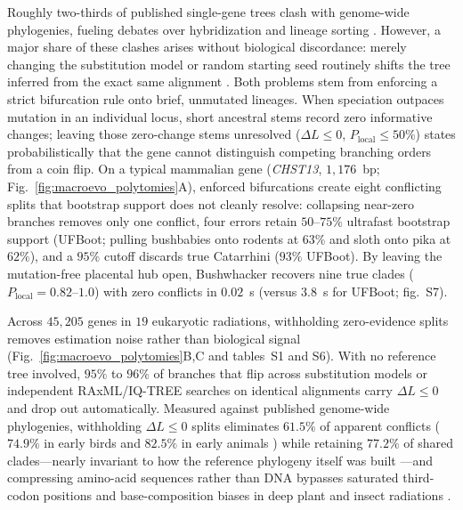 \documentclass[12pt]{article}
\begin{document}
Roughly two-thirds of published single-gene trees clash with genome-wide phylogenies, fueling debates over hybridization and lineage sorting \cite{rokas2006animal,shen2017contentious}. However, a major share of these clashes arises without biological discordance: merely changing the substitution model or random starting seed routinely shifts the tree inferred from the exact same alignment \cite{abadi2019model}. Both problems stem from enforcing a strict bifurcation rule onto brief, unmutated lineages. When speciation outpaces mutation in an individual locus, short ancestral stems record zero informative changes; leaving those zero-change stems unresolved ($\Delta L \le 0$, $P_{\mathrm{local}} \le 50\%$) states probabilistically that the gene cannot distinguish competing branching orders from a coin flip. On a typical mammalian gene (\textit{CHST13}, $1,176$~bp; Fig.~\ref{fig:macroevo_polytomies}A), enforced bifurcations create eight conflicting splits that bootstrap support does not cleanly resolve: collapsing near-zero branches removes only one conflict, four errors retain $50$--$75\%$ ultrafast bootstrap support (UFBoot; pulling bushbabies onto rodents at $63\%$ and sloth onto pika at $62\%$), and a $95\%$ cutoff discards true Catarrhini ($93\%$ UFBoot). By leaving the mutation-free placental hub open, Bushwhacker recovers nine true clades ($P_{\mathrm{local}} = 0.82$--$1.0$) with zero conflicts in $0.02$~s (versus $3.8$~s for UFBoot; fig.~S7).

Across $45,205$ genes in $19$ eukaryotic radiations, withholding zero-evidence splits removes estimation noise rather than biological signal (Fig.~\ref{fig:macroevo_polytomies}B,C and tables~S1 and S6). With no reference tree involved, $95\%$ to $96\%$ of branches that flip across substitution models or independent RAxML/IQ-TREE searches on identical alignments carry $\Delta L \le 0$ and drop out automatically. Measured against published genome-wide phylogenies, withholding $\Delta L \le 0$ splits eliminates $61.5\%$ of apparent conflicts ($74.9\%$ in early birds \cite{jarvis2014whole,prum2015comprehensive} and $82.5\%$ in early animals \cite{rokas2006animal}) while retaining $77.2\%$ of shared clades---nearly invariant to how the reference phylogeny itself was built \cite{wickett2014phylotranscriptomic}---and compressing amino-acid sequences rather than DNA bypasses saturated third-codon positions and base-composition biases in deep plant and insect radiations \cite{misof2014phylogenomics}.
\end{document}
